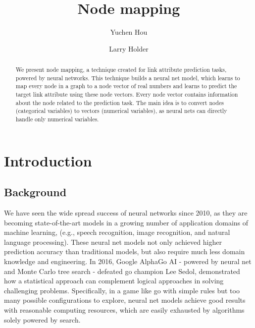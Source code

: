 \documentclass{article}
\begin{document}
\lstset{language=python, tabsize=4}
\title{Node mapping}
\author{Yuchen Hou \and Larry Holder}
\maketitle

\begin{abstract}
	We present node mapping, a technique created for link attribute prediction tasks, powered by neural networks.
	This technique builds a neural net model, which learns to map every node in 
	a graph to a node vector of real numbers and learns to predict the target 
	link attribute using these node vectors.
	Every node vector contains information about the node related to the
	prediction task.
	The main idea is to convert nodes (categorical variables) to vectors 
	(numerical variables), as neural nets can directly handle only numerical 
	variables.
\end{abstract}

\section{Introduction}

\subsection{Background}
We have seen the wide spread success of neural networks since 2010, as they are becoming state-of-the-art models in a growing number of application domains of machine learning, (e.g., speech recognition\cite{hannun2014deep}, image recognition\cite{simonyan2014very}, and natural language processing\cite{yao2013recurrent}).
These neural net models not only achieved higher prediction accuracy than traditional models, but also require much less domain knowledge and engineering.
In 2016, Google AlphaGo AI - powered by neural net and Monte Carlo tree search - defeated go champion Lee Sedol, demonstrated how a statistical approach can complement logical approaches in solving challenging problems\cite{silver2016mastering}.
Specifically, in a game like go with simple rules but too many possible configurations to explore, neural net models achieve good results with reasonable computing resources, which are easily exhausted by algorithms solely powered by search.
\end{document}
